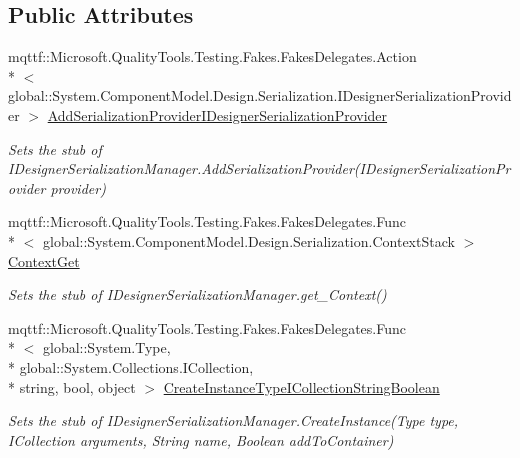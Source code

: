 \subsection*{Public Attributes}
\begin{DoxyCompactItemize}
\item 
mqttf\-::\-Microsoft.\-Quality\-Tools.\-Testing.\-Fakes.\-Fakes\-Delegates.\-Action\\*
$<$ global\-::\-System.\-Component\-Model.\-Design.\-Serialization.\-I\-Designer\-Serialization\-Provider $>$ \hyperlink{class_system_1_1_component_model_1_1_design_1_1_serialization_1_1_fakes_1_1_stub_i_designer_serialization_manager_ae7c08b5a01747868294f30e6892adc58}{Add\-Serialization\-Provider\-I\-Designer\-Serialization\-Provider}
\begin{DoxyCompactList}\small\item\em Sets the stub of I\-Designer\-Serialization\-Manager.\-Add\-Serialization\-Provider(\-I\-Designer\-Serialization\-Provider provider)\end{DoxyCompactList}\item 
mqttf\-::\-Microsoft.\-Quality\-Tools.\-Testing.\-Fakes.\-Fakes\-Delegates.\-Func\\*
$<$ global\-::\-System.\-Component\-Model.\-Design.\-Serialization.\-Context\-Stack $>$ \hyperlink{class_system_1_1_component_model_1_1_design_1_1_serialization_1_1_fakes_1_1_stub_i_designer_serialization_manager_a4bb845fa1b7a1581fb9ca52e5c7e0685}{Context\-Get}
\begin{DoxyCompactList}\small\item\em Sets the stub of I\-Designer\-Serialization\-Manager.\-get\-\_\-\-Context()\end{DoxyCompactList}\item 
mqttf\-::\-Microsoft.\-Quality\-Tools.\-Testing.\-Fakes.\-Fakes\-Delegates.\-Func\\*
$<$ global\-::\-System.\-Type, \\*
global\-::\-System.\-Collections.\-I\-Collection, \\*
string, bool, object $>$ \hyperlink{class_system_1_1_component_model_1_1_design_1_1_serialization_1_1_fakes_1_1_stub_i_designer_serialization_manager_a7737775d62be5a1e57aaad0dd0b99861}{Create\-Instance\-Type\-I\-Collection\-String\-Boolean}
\begin{DoxyCompactList}\small\item\em Sets the stub of I\-Designer\-Serialization\-Manager.\-Create\-Instance(\-Type type, I\-Collection arguments, String name, Boolean add\-To\-Container)\end{DoxyCompactList}\item 

\end{DoxyCompactItemize}
